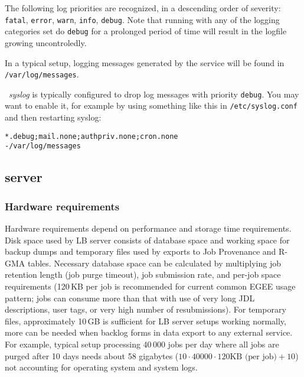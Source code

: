 The following log priorities are recognized, in a descending order of severity: \texttt{fatal}, \texttt{error}, \texttt{warn}, \texttt{info}, \texttt{debug}. Note that running with any of the logging categories set do \texttt{debug} for a prolonged period of time will result in the logfile growing uncontroledly.

In a typical setup, logging messages generated by the \LB service will be found in \texttt{/var/log/messages}.

\note\ \emph{syslog} is typically configured to drop log messages with priority \texttt{debug}. You may want to enable it, for example by using something like this in \texttt{/etc/syslog.conf} and then restarting {syslog}:
\begin{verbatim}
*.debug;mail.none;authpriv.none;cron.none                -/var/log/messages
\end{verbatim}

\subsection{\LB server}

\subsubsection{Hardware requirements}
\label{inst:hw_req}

Hardware requirements depend on performance and storage time requirements.
Disk space used by LB server consists of database space and working space 
for backup dumps and temporary files used by exports to Job Provenance and
R-GMA tables. Necessary database space can be calculated by multiplying 
job retention length (job purge timeout), job submission rate, and  
per-job space requirements (120\,KB per job is recommended for current common 
EGEE usage pattern; jobs can consume more than that with use of very long
JDL descriptions, user tags, or very high number of resubmissions).
For temporary files, approximately 10\,GB is sufficient for LB server setups
working normally, more can be needed when backlog forms in data export
to any external service. For example, typical setup processing 40\,000 jobs per 
day where all jobs are purged after 10 days needs about 58 gigabytes
($10 \cdot 40000 \cdot 120 \mbox{KB (per job)} + 10$) not accounting for operating 
system and system logs.

